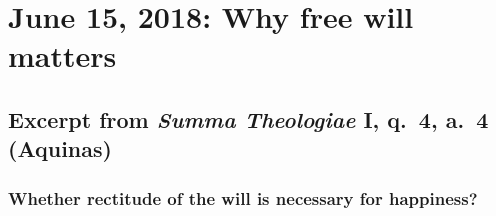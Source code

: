 \documentclass{bookclub}
\begin{document}
	\pagestyle{mystyle}
%	
	\chapter{June 15, 2018: Why free will matters}
	\begin{multicols}{2}
	\section{Excerpt from \emph{Summa Theologiae} I, q.~4, a.~4 (Aquinas)}
	\subsection{Whether rectitude of the will is necessary for happiness?}
	

\end{multicols}
\end{document}
